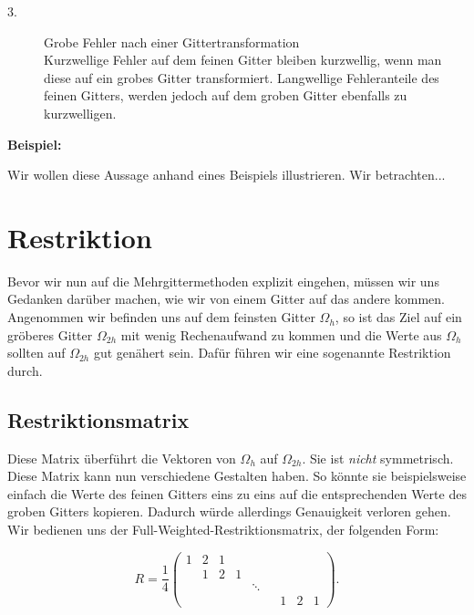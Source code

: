 \begin{description}

\item[3.] Grobe Fehler nach einer Gittertransformation \\
Kurzwellige Fehler auf dem feinen Gitter bleiben kurzwellig, wenn man diese auf ein grobes Gitter transformiert. Langwellige Fehleranteile des feinen Gitters, werden jedoch auf dem groben Gitter ebenfalls zu kurzwelligen.

\end{description}

\textbf{Beispiel:}

Wir wollen diese Aussage anhand eines Beispiels illustrieren. Wir betrachten...

\section{Restriktion}

Bevor wir nun auf die Mehrgittermethoden explizit eingehen, müssen wir uns Gedanken darüber machen, wie wir von einem Gitter auf das andere kommen. Angenommen wir befinden uns auf dem feinsten Gitter $\Omega_{h}$, so ist das Ziel auf ein gröberes Gitter $\Omega_{2h}$ mit wenig Rechenaufwand zu kommen und die Werte aus $\Omega_{h}$ sollten auf $\Omega_{2h}$ gut genähert sein. Dafür führen wir eine sogenannte Restriktion durch.

\subsection{Restriktionsmatrix}

Diese Matrix überführt die Vektoren von $\Omega_{h}$ auf $\Omega_{2h}$. Sie ist \textit{nicht} symmetrisch. Diese Matrix kann nun verschiedene Gestalten haben. So könnte sie beispielsweise einfach die Werte des feinen Gitters eins zu eins auf die entsprechenden Werte des groben Gitters kopieren. Dadurch würde allerdings Genauigkeit verloren gehen. Wir bedienen uns der Full-Weighted-Restriktionsmatrix, der folgenden Form:

\begin{equation}
R = \frac {1} {4}
\begin{pmatrix}
1 & 2 & 1 & & & & & & \\
 & 1 & 2 & 1 & & & & & \\
 &&&&\ddots&&&& \\
 & & & & & & 1 & 2 & 1
\end{pmatrix}.
\end{equation}

